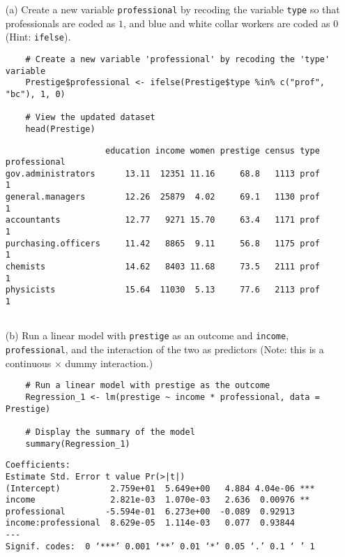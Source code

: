 \documentclass[12pt,letterpaper]{article}
\begin{document}
\newpage
\begin{enumerate}
	
	\item [(a)]
	Create a new variable \texttt{professional} by recoding the variable \texttt{type} so that professionals are coded as $1$, and blue and white collar workers are coded as $0$ (Hint: \texttt{ifelse}).
	
	\vspace{0cm}
	
	\begin{lstlisting}
	# Create a new variable 'professional' by recoding the 'type' variable
	Prestige$professional <- ifelse(Prestige$type %in% c("prof", "bc"), 1, 0)
		
	# View the updated dataset
	head(Prestige)
	\end{lstlisting}
	
	\begin{verbatim}
                    education income women prestige census type professional
gov.administrators      13.11  12351 11.16     68.8   1113 prof            1
general.managers        12.26  25879  4.02     69.1   1130 prof            1
accountants             12.77   9271 15.70     63.4   1171 prof            1
purchasing.officers     11.42   8865  9.11     56.8   1175 prof            1
chemists                14.62   8403 11.68     73.5   2111 prof            1
physicists              15.64  11030  5.13     77.6   2113 prof            1
		
	\end{verbatim}
	
	
	\item [(b)]
	Run a linear model with \texttt{prestige} as an outcome and \texttt{income}, \texttt{professional}, and the interaction of the two as predictors (Note: this is a continuous $\times$ dummy interaction.)
	
	\begin{lstlisting}
	# Run a linear model with prestige as the outcome
	Regression_1 <- lm(prestige ~ income * professional, data = Prestige)

	# Display the summary of the model
	summary(Regression_1)
	\end{lstlisting}
	
	\begin{verbatim}
Coefficients:
Estimate Std. Error t value Pr(>|t|)    
(Intercept)          2.759e+01  5.649e+00   4.884 4.04e-06 ***
income               2.821e-03  1.070e-03   2.636  0.00976 ** 
professional        -5.594e-01  6.273e+00  -0.089  0.92913    
income:professional  8.629e-05  1.114e-03   0.077  0.93844    
---
Signif. codes:  0 ‘***’ 0.001 ‘**’ 0.01 ‘*’ 0.05 ‘.’ 0.1 ‘ ’ 1


\end{verbatim}
\end{enumerate}
\end{document}
